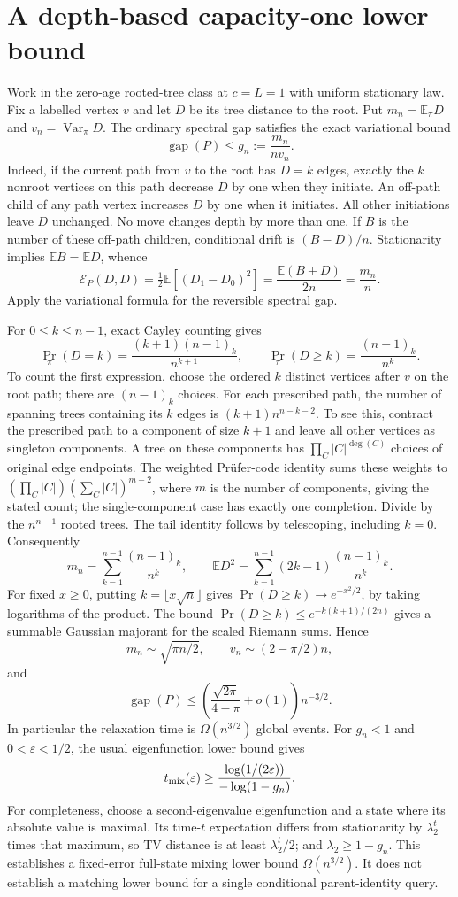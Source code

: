 \documentclass[11pt]{article}
\begin{document}
\section{A depth-based capacity-one lower bound}
Work in the zero-age rooted-tree class at $c=L=1$ with uniform
stationary law. Fix a labelled vertex $v$ and let $D$ be its tree
distance to the root. Put $m_n=\mathbb E_\pi D$ and
$v_n=\operatorname{Var}_\pi D$.
The ordinary spectral gap satisfies the exact variational bound
\[
 \operatorname{gap}(P)\le g_n:=\frac{m_n}{n v_n}.
\]
Indeed, if the current path from $v$ to the root has $D=k$ edges,
exactly the $k$ nonroot vertices on this path decrease $D$ by one
when they initiate. An off-path child of any path vertex increases
$D$ by one when it initiates. All other initiations leave $D$
unchanged. No move changes depth by more than one. If $B$ is the
number of these off-path children, conditional drift is $(B-D)/n$.
Stationarity implies $\mathbb E B=\mathbb E D$, whence
\[
 \mathcal E_P(D,D)=\tfrac12\mathbb E[(D_1-D_0)^2]
 =\frac{\mathbb E(B+D)}{2n}=\frac{m_n}{n}.
\]
Apply the variational formula for the reversible spectral gap.

For $0\le k\le n-1$, exact Cayley counting gives
\[
 \Pr_\pi(D=k)=\frac{(k+1)(n-1)_k}{n^{k+1}},
 \qquad \Pr_\pi(D\ge k)=\frac{(n-1)_k}{n^k}.
\]
To count the first expression, choose the ordered $k$ distinct
vertices after $v$ on the root path; there are $(n-1)_k$ choices.
For each prescribed path, the number of spanning trees containing
its $k$ edges is $(k+1)n^{n-k-2}$. To see this, contract the
prescribed path to a component of size $k+1$ and leave all other
vertices as singleton components. A tree on these components has
$\prod_C |C|^{\deg(C)}$ choices of original edge endpoints.
The weighted Pr\"ufer-code identity sums these weights to
$(\prod_C|C|)(\sum_C|C|)^{m-2}$, where $m$ is the number of
components, giving the stated count; the single-component case
has exactly one completion. Divide by the $n^{n-1}$ rooted trees. The tail
identity follows by telescoping, including $k=0$.
Consequently
\[
 m_n=\sum_{k=1}^{n-1}\frac{(n-1)_k}{n^k},\qquad
 \mathbb E D^2=\sum_{k=1}^{n-1}(2k-1)\frac{(n-1)_k}{n^k}.
\]
For fixed $x\ge0$, putting $k=\lfloor x\sqrt n\rfloor$ gives
$\Pr(D\ge k)\to e^{-x^2/2}$, by taking logarithms of the product.
The bound $\Pr(D\ge k)\le e^{-k(k+1)/(2n)}$ gives a summable
Gaussian majorant for the scaled Riemann sums. Hence
\[
 m_n\sim\sqrt{\pi n/2},\qquad
 v_n\sim(2-\pi/2)n,
\]
and
\[
 \operatorname{gap}(P)\le
 \left(\frac{\sqrt{2\pi}}{4-\pi}+o(1)\right)n^{-3/2}.
\]
In particular the relaxation time is $\Omega(n^{3/2})$ global events.
For $g_n<1$ and $0<\varepsilon<1/2$, the usual eigenfunction
lower bound gives
\[
 t_{\rm mix}(\varepsilon)\ge
 \frac{\log(1/(2\varepsilon))}{-\log(1-g_n)}.
\]
For completeness, choose a second-eigenvalue eigenfunction and a
state where its absolute value is maximal. Its time-$t$ expectation
differs from stationarity by $\lambda_2^t$ times that maximum, so
TV distance is at least $\lambda_2^t/2$; and
$\lambda_2\ge1-g_n$. This establishes a fixed-error full-state
mixing lower bound $\Omega(n^{3/2})$. It does not establish a
matching lower bound for a single conditional parent-identity query.
\end{document}
